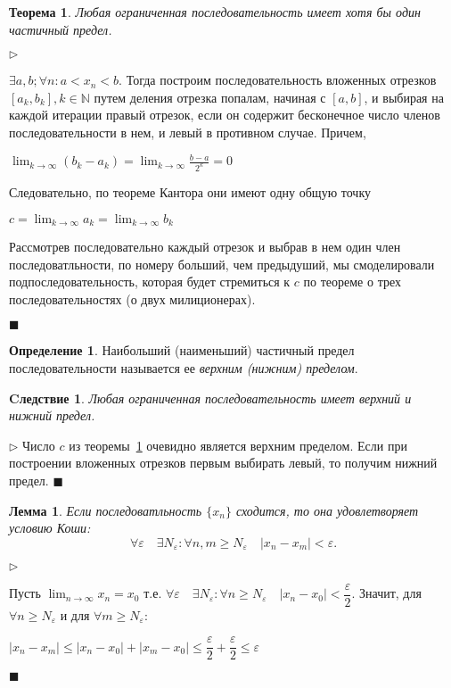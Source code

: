 \documentclass{urticle}
\newtheorem{theorem}{Теорема}
\newtheorem{lemma}{Лемма}
\newtheorem{consectary}{Cледствие}
\theoremstyle{definition}
\newtheorem{definition}{Определение}
\newcommand{\prf}[1]{\hspace{0.3cm}$\triangleright$ \hspace{0.2cm} {#1} \hfill $\blacksquare$ }
\begin{document}
    \begin{theorem}
    \label{th:Bol-Ver}
        Любая ограниченная последовательность имеет хотя бы один частичный предел.
    \end{theorem}
    \prf{$\exists a, b; \forall n: a < x_n < b$. Тогда построим последовательность вложенных отрезков $[a_k, b_k], k\in\mathbb{N}$ путем деления отрезка попалам, начиная с $[a, b]$, и выбирая на каждой итерации правый отрезок, если он содержит бесконечное число членов последовательности в нем, и левый в противном случае. Причем, 
    \begin{center}
        $\displaystyle \lim_{k\to\infty}(b_k - a_k) = \lim_{k\to\infty} \frac{b-a}{2^k} = 0$  
    \end{center}        
    Следовательно, по теореме Кантора они имеют одну общую точку
    \begin{center}
        $\displaystyle c = \lim_{k\to\infty}a_k = \lim_{k\to\infty}b_k$
    \end{center}
    Рассмотрев последовательно каждый отрезок и выбрав в нем один член последоватльности, по номеру больший, чем предыдуший, мы смоделировали подпоследовательность, которая будет стремиться к $c$ по теореме о трех последовательностях (о двух милиционерах).
    }
    
    \begin{definition}
    \label{def:UpLowLimit}    
        Наибольший (наименьший) частичный предел последовательности называется ее \textit{верхним (нижним) пределом}.
    \end{definition}
    
    \begin{consectary}
    \label{th:UpLowLimit}    
        Любая ограниченная последовательность имеет верхний и нижний предел.
    \end{consectary}
    \prf{Число $c$ из теоремы~\ref{th:Bol-Ver} очевидно является верхним пределом. Если при построении вложенных отрезков первым выбирать левый, то получим нижний предел. }
    
    \begin{lemma}
    \label{lem:Koshi}
        Если последоватльность $\{x_n\}$ сходится, то она удовлетворяет условию Коши:
        \begin{equation}
        \label{IfKoshi}
            \forall\varepsilon  \quad \exists N_\varepsilon: \forall n,m \geq N_\varepsilon \quad |x_n - x_m| < \varepsilon.
        \end{equation}
    \end{lemma}
    \prf{Пусть $\displaystyle \lim_{n\to\infty}x_n = x_0$ т.е. $\forall\varepsilon  \quad \exists N_\varepsilon: \forall n \geq N_\varepsilon \quad |x_n - x_0| < \dfrac{\varepsilon}{2}$. Значит, для $\forall n \geq N_\varepsilon$ и для $\forall m \geq N_\varepsilon$:
    \begin{center}
        $|x_n - x_m| \leq |x_n - x_0| + |x_m - x_0| \leq \dfrac{\varepsilon}{2} + \dfrac{\varepsilon}{2} \leq \varepsilon $
    \end{center}
    }
        
\end{document}
